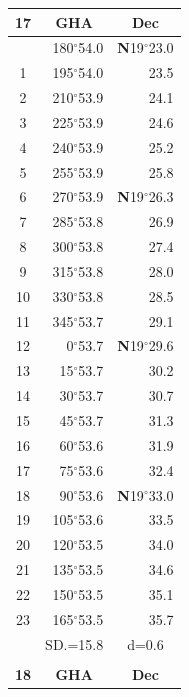 \documentclass[10pt, a4paper]{report}
\begin{document}
\begin{scriptsize}
\noindent
\begin{tabular*}{0.2\textwidth}[t]{@{\extracolsep{\fill}}|c|rr|}
\hline
\multicolumn{1}{|c|}{\rule{0pt}{2.6ex}\textbf{17}} & \multicolumn{1}{c}{\textbf{GHA}} & \multicolumn{1}{c|}{\textbf{Dec}}\\
\hline\rule{0pt}{2.6ex}\noindent
0 & 180$^\circ$54.0 & \textbf{N}19$^\circ$23.0\\
1 & 195$^\circ$54.0 & 23.5\\
2 & 210$^\circ$53.9 & 24.1\\
3 & 225$^\circ$53.9 & \raisebox{0.24ex}{\boldmath$\cdot$~\boldmath$\cdot$~~}24.6\\
4 & 240$^\circ$53.9 & 25.2\\
5 & 255$^\circ$53.9 & 25.8\\[2Pt]
6 & 270$^\circ$53.9 & \textbf{N}19$^\circ$26.3\\
7 & 285$^\circ$53.8 & 26.9\\
8 & 300$^\circ$53.8 & 27.4\\
9 & 315$^\circ$53.8 & \raisebox{0.24ex}{\boldmath$\cdot$~\boldmath$\cdot$~~}28.0\\
10 & 330$^\circ$53.8 & 28.5\\
11 & 345$^\circ$53.7 & 29.1\\[2Pt]
12 & 0$^\circ$53.7 & \textbf{N}19$^\circ$29.6\\
13 & 15$^\circ$53.7 & 30.2\\
14 & 30$^\circ$53.7 & 30.7\\
15 & 45$^\circ$53.7 & \raisebox{0.24ex}{\boldmath$\cdot$~\boldmath$\cdot$~~}31.3\\
16 & 60$^\circ$53.6 & 31.9\\
17 & 75$^\circ$53.6 & 32.4\\[2Pt]
18 & 90$^\circ$53.6 & \textbf{N}19$^\circ$33.0\\
19 & 105$^\circ$53.6 & 33.5\\
20 & 120$^\circ$53.5 & 34.0\\
21 & 135$^\circ$53.5 & \raisebox{0.24ex}{\boldmath$\cdot$~\boldmath$\cdot$~~}34.6\\
22 & 150$^\circ$53.5 & 35.1\\
23 & 165$^\circ$53.5 & 35.7\\
\hline
\rule{0pt}{2.4ex} & \multicolumn{1}{c}{SD.=15.8} & \multicolumn{1}{c|}{d=0.6}\\
\hline
\multicolumn{1}{c}{}\\[-0.5ex]\hline
\multicolumn{1}{|c|}{\rule{0pt}{2.6ex}\textbf{18}} & \multicolumn{1}{c}{\textbf{GHA}} & \multicolumn{1}{c|}{\textbf{Dec}}\\

\end{tabular*}
\end{scriptsize}
\end{document}
